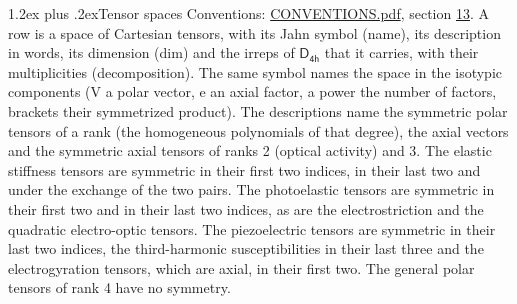\documentclass[10pt,a4paper]{article}
\makeatletter
\renewcommand\section{\@startsection{section}{1}{\z@}{-3ex plus -1ex minus -.2ex}%
  {1.2ex plus .2ex}{\normalfont\large\sffamily\bfseries\color{parttitle}}}
\numberwithin{equation}{section}
\newcommand{\grp}[1]{\mathsf{#1}}
\makeatother
\begin{document}
\section{Tensor spaces}\label{s:tensor_spaces}
Conventions: \href{../../CONVENTIONS.pdf}{CONVENTIONS.pdf}, section \href{../../CONVENTIONS.pdf\#conv.13}{13}.
\leavevmode\label{n:head.name}\label{n:head.description}\label{n:head.dim}\label{n:head.decomposition}A row is a space of Cartesian tensors, with its Jahn symbol (name), its description in words, its dimension (dim) and the irreps of $\grp{D_{4h}}$ that it carries, with their multiplicities (decomposition). \label{n:label.jahn}The same symbol names the space in the isotypic components (V a polar vector, e an axial factor, a power the number of factors, brackets their symmetrized product). The descriptions name the symmetric polar tensors of a rank (the homogeneous polynomials of that degree), the axial vectors and the symmetric axial tensors of ranks 2 (optical activity) and 3. The elastic stiffness tensors are symmetric in their first two indices, in their last two and under the exchange of the two pairs. The photoelastic tensors are symmetric in their first two and in their last two indices, as are the electrostriction and the quadratic electro-optic tensors. The piezoelectric tensors are symmetric in their last two indices, the third-harmonic susceptibilities in their last three and the electrogyration tensors, which are axial, in their first two. The general polar tensors of rank 4 have no symmetry.
\end{document}
